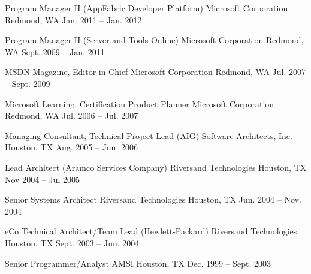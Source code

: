 \begin{cventries}

\cventry 
{Program Manager II (AppFabric Developer Platform)}
{Microsoft Corporation}
{Redmond, WA}
{Jan. 2011 – Jan. 2012}
{}


\cventry 
{Program Manager II (Server and Tools Online)}
{Microsoft Corporation}
{Redmond, WA}
{Sept. 2009 – Jan. 2011}
{}


\cventry
{MSDN Magazine, Editor-in-Chief}
{Microsoft Corporation}
{Redmond, WA}
{Jul. 2007 – Sept. 2009}
{}


\cventry 
{Microsoft Learning, Certification Product Planner}
{Microsoft Corporation}
{Redmond, WA}
{Jul. 2006 – Jul. 2007}
{}


\cventry 
{Managing Consultant, Technical Project Lead (AIG)}
{Software Architects, Inc.}
{Houston, TX}
{Aug. 2005 – Jun. 2006}
{}


\cventry 
{Lead Architect (Aramco Services Company)}
{Riversand Technologies}
{Houston, TX}
{Nov 2004 – Jul 2005}
{}


\cventry 
{Senior Systems Architect}
{Riversand Technologies}
{Houston, TX}
{Jun. 2004 – Nov. 2004}
{}


\cventry 
{eCo Technical Architect/Team Lead (Hewlett-Packard)}
{Riversand Technologies}
{Houston, TX}
{Sept. 2003 – Jun. 2004}
{}


\cventry 
{Senior Programmer/Analyst}
{AMSI}
{Houston, TX}
{Dec. 1999 – Sept. 2003}
{}


\end{cventries}